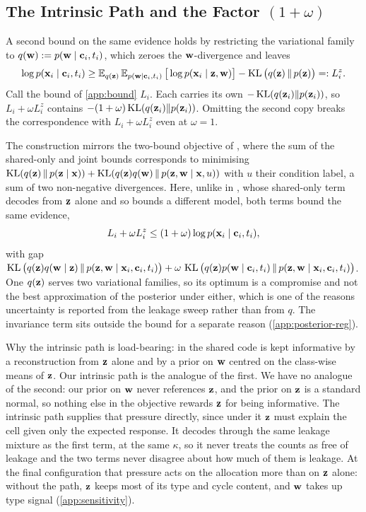 \subsection{The Intrinsic Path and the Factor \texorpdfstring{$(1+\omega)$}{(1+omega)}}
\label{app:pathb}

 A second bound on the same evidence holds by restricting the variational family to $q(\mathbf{w}) := p(\mathbf{w} \mid \mathbf{c}_i, t_i)$, which zeroes the $\mathbf{w}$-divergence and leaves
\begin{equation}
  \log p(\mathbf{x}_i \mid \mathbf{c}_i, t_i) \geq \operatorname{\mathbb{E}}_{q(\mathbf{z})}\operatorname{\mathbb{E}}_{p(\mathbf{w} \mid \mathbf{c}_i, t_i)}\big[\log p(\mathbf{x}_i \mid \mathbf{z}, \mathbf{w})\big] - \operatorname{KL}\big(q(\mathbf{z})\,\|\,p(\mathbf{z})\big) =: L_i^{z}.
\end{equation}
Call the bound of \cref{app:bound} $L_i$. Each carries its own $-\operatorname{KL}(q(\mathbf{z}_i)\|p(\mathbf{z}_i))$, so $L_i + \omega L_i^{z}$ contains $-(1+\omega)\operatorname{KL}(q(\mathbf{z}_i)\|p(\mathbf{z}_i))$. Omitting the second copy breaks the correspondence with $L_i + \omega L_i^{z}$ even at $\omega = 1$.

The construction mirrors the two-bound objective of \citet{slavutsky2025}, where the sum of the shared-only and joint bounds corresponds to minimising $\operatorname{KL}(q(\mathbf{z}) \,\|\, p(\mathbf{z} \mid \mathbf{x})) + \operatorname{KL}(q(\mathbf{z})q(\mathbf{w}) \,\|\, p(\mathbf{z},\mathbf{w} \mid \mathbf{x}, u))$ with $u$ their condition label, a sum of two non-negative divergences. Here, unlike in \citet{slavutsky2025}, whose shared-only term decodes from $\mathbf{z}$ alone and so bounds a different model, both terms bound the same evidence,
\begin{equation*}
  L_i + \omega L_i^{z} \le (1+\omega)\log p(\mathbf{x}_i \mid \mathbf{c}_i, t_i),
\end{equation*}
with gap $\operatorname{KL}\big(q(\mathbf{z})q(\mathbf{w} \mid \mathbf{z})\,\|\,p(\mathbf{z},\mathbf{w} \mid \mathbf{x}_i,\mathbf{c}_i,t_i)\big) + \omega\,\operatorname{KL}\big(q(\mathbf{z})p(\mathbf{w} \mid \mathbf{c}_i,t_i)\,\|\,p(\mathbf{z},\mathbf{w} \mid \mathbf{x}_i,\mathbf{c}_i,t_i)\big)$. One $q(\mathbf{z})$ serves two variational families, so its optimum is a compromise and not the best approximation of the posterior under either, which is one of the reasons uncertainty is reported from the leakage sweep rather than from $q$. The invariance term sits outside the bound for a separate reason (\cref{app:posterior-reg}).

Why the intrinsic path is load-bearing: in \citet{slavutsky2025} the shared code is kept informative by a reconstruction from $\mathbf{z}$ alone and by a prior on $\mathbf{w}$ centred on the class-wise means of $\mathbf{z}$. Our intrinsic path is the analogue of the first. We have no analogue of the second: our prior on $\mathbf{w}$ never references $\mathbf{z}$, and the prior on $\mathbf{z}$ is a standard normal, so nothing else in the objective rewards $\mathbf{z}$ for being informative. The intrinsic path supplies that pressure directly, since under it $\mathbf{z}$ must explain the cell given only the expected response. It decodes through the same leakage mixture as the first term, at the same $\kappa$, so it never treats the counts as free of leakage and the two terms never disagree about how much of them is leakage. At the final configuration that pressure acts on the allocation more than on $\mathbf{z}$ alone: without the path, $\mathbf{z}$ keeps most of its type and cycle content, and $\mathbf{w}$ takes up type signal (\cref{app:sensitivity}).

